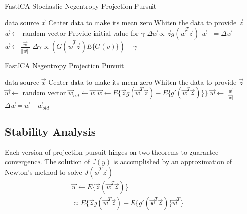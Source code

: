 \documentclass[12pt ]{article}
\begin{document}
\begin{algorithm}
\caption{FastICA Stochastic Negentropy Projection Pursuit}
\label{alg:FastICA-Stochastic-Negentropy-Projection-Pursuit}
\begin{algorithmic}
	\REQUIRE data source $\vec{x}$
	\STATE Center data to make its mean zero
	\STATE Whiten the data to provide $\vec{z}$
	\STATE $\vec{w} \leftarrow$ random vector
	\STATE Provide initial value for $\gamma$
	\REPEAT
		\STATE $\Delta \vec{w} \propto \vec{z}g(\vec{w}^T\vec{z})$
		\STATE $\vec{w} += \Delta \vec{w} $
		\STATE $\vec{w} \leftarrow \frac{\vec{w}}{||\vec{w}||}$
		\STATE $\Delta \gamma \propto (G(\vec{w}^T \vec{z}) E\{G(v)\}) - \gamma$
\end{algorithmic}
\end{algorithm}


\begin{algorithm}
\caption{FastICA  Negentropy Projection Pursuit}
\label{alg:FastICA-Negentropy-Projection-Pursuit}
\begin{algorithmic}
	\REQUIRE data source $\vec{x}$
	\STATE Center data to make its mean zero
	\STATE Whiten the data to provide $\vec{z}$
	\STATE $\vec{w} \leftarrow$ random vector
	\REPEAT
		\STATE $\vec{w}_{old} \leftarrow \vec{w}$
		\STATE $\vec{w} \leftarrow E \{ \vec{z} g(\vec{w}^T \vec{z}) - E\{ g' (\vec{w}^T \vec{z}) \} \}$
		\STATE $\vec{w} \leftarrow \frac{\vec{w}}{||\vec{w}||}$
		\STATE $\Delta \vec{w} = \vec{w} - \vec{w}_{old}$
\end{algorithmic}
\end{algorithm}

\subsection{Stability Analysis}
Each version of projection pursuit hinges on two theorems to guarantee convergence.  The solution of $J(y)$ is accomplished by an approximation of Newton's method to solve $J(\vec{w}^T \vec{z})$.
\begin{eqnarray}
	\vec{w} \leftarrow E \{ \vec{z} (\vec{w}^T \vec{z}) \} \\
	\approx E \{ \vec{z}g(\vec{w}^T \vec{z}) - E\{ g'(\vec{w}^T \vec{z}) \}\vec{w}^T \}
\end{eqnarray} 
\end{document}
